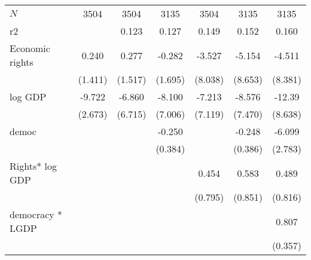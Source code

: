 \documentclass[10pt,letterpaper,subeqn]{beamer}
\begin{document}
\begin{frame}[label=placebo1]
\begin{table}[htbp]
\begin{tabular}{l*{6}{c}}
\hline
\(N\)       &        3504         &        3504         &        3135         &        3504         &        3135         &        3135         \\
r2          &                     &       0.123         &       0.127         &       0.149         &       0.152         &       0.160         \\
\hline\hline
Economic rights       &       0.240         &       0.277         &      -0.282         &      -3.527         &      -5.154         &      -4.511         \\
            &     (1.411)         &     (1.517)         &     (1.695)         &     (8.038)         &     (8.653)         &     (8.381)         \\

log GDP        &      -9.722\sym{***}&      -6.860         &      -8.100         &      -7.213         &      -8.576         &      -12.39         \\
            &     (2.673)         &     (6.715)         &     (7.006)         &     (7.119)         &     (7.470)         &     (8.638)         \\

democ       &                     &                     &      -0.250         &                     &      -0.248         &      -6.099\sym{**} \\
            &                     &                     &     (0.384)         &                     &     (0.386)         &     (2.783)         \\

Rights* log GDP   &                     &                     &                     &       0.454         &       0.583         &       0.489         \\
            &                     &                     &                     &     (0.795)         &     (0.851)         &     (0.816)         \\

democracy * LGDP   &                     &                     &                     &                     &                     &       0.807\sym{**} \\
            &                     &                     &                     &                     &                     &     (0.357)         \\


\end{tabular}
\end{table}
\end{frame}
\end{document}

